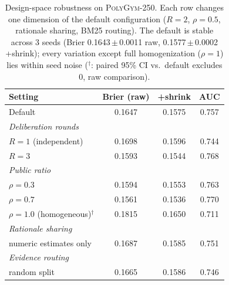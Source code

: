 \begin{table}[t]
\centering
\small
\caption{Design-space robustness on \textsc{PolyGym}-250. Each row changes one dimension of the default configuration ($R{=}2$, $\rho{=}0.5$, rationale sharing, BM25 routing). The default is stable across 3 seeds (Brier 0.1643\,$\pm$\,0.0011 raw, 0.1577\,$\pm$\,0.0002 +shrink); every variation except full homogenization ($\rho{=}1$) lies within seed noise ($^\dagger$: paired 95\% CI vs.\ default excludes 0, raw comparison).}
\label{tab:design}
\begin{tabular}{lccc}
\toprule
Setting & Brier (raw) & +shrink & AUC \\
\midrule
Default & 0.1647 & 0.1575 & 0.757 \\
\midrule
\multicolumn{4}{l}{\textit{Deliberation rounds}} \\
\quad $R{=}1$ (independent) & 0.1698 & 0.1596 & 0.744 \\
\quad $R{=}3$ & 0.1593 & 0.1544 & 0.768 \\
\multicolumn{4}{l}{\textit{Public ratio}} \\
\quad $\rho{=}0.3$ & 0.1594 & 0.1553 & 0.763 \\
\quad $\rho{=}0.7$ & 0.1561 & 0.1536 & 0.770 \\
\quad $\rho{=}1.0$ (homogeneous)$^\dagger$ & 0.1815 & 0.1650 & 0.711 \\
\multicolumn{4}{l}{\textit{Rationale sharing}} \\
\quad numeric estimates only & 0.1687 & 0.1585 & 0.751 \\
\multicolumn{4}{l}{\textit{Evidence routing}} \\
\quad random split & 0.1665 & 0.1586 & 0.746 \\
\bottomrule
\end{tabular}
\end{table}
